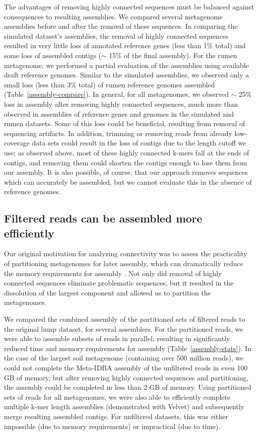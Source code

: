 \documentclass[10pt]{article}
\begin{document}
The advantages of removing highly connected sequences must be balanced
against consequences to resulting assemblies.  We compared several
metagenome assemblies before and after the removal of these sequences.
In comparing the simulated dataset's assemblies, the removal of highly
connected sequences resulted in very little loss of annotated
reference genes (less than 1\% total) and some loss of assembled contigs
($\sim$ 15\% of the final assembly).  For the rumen metagenome, we
performed a partial evaluation of the assemblies using available draft
reference genomes.  Similar to the simulated assemblies, we observed
only a small loss (less than 3\% total) of rumen reference genomes assembled
(Table~\ref{assembly-compare}). In general, for all metagenomes, we observed $\sim$ 25\%
loss in assembly after removing highly connected sequences, much more
than observed in assemblies of reference genes and genomes in the
simulated and rumen datasets.  Some of this loss could be beneficial,
resulting from removal of sequencing artifacts.  In addition, trimming
or removing reads from already low-coverage data sets could result in
the loss of contigs due to the length cutoff we use; as observed
above, most of these highly connected k-mers fall at the ends of
contigs, and removing them could shorten the contigs enough to lose
them from our assembly.  It is also possible, of course, that our
approach removes sequences which can accurately be assembled, but we
cannot evaluate this in the absence of reference genomes.

\subsection*{Filtered reads can be assembled more efficiently}

Our original motivation for analyzing connectivity was to assess the
practicality of partitioning metagenomes for later assembly, which can
dramatically reduce the memory requirements for assembly
\cite{Pell:2012cq}.  Not only did removal of highly connected sequences
eliminate problematic sequences, but it resulted in the dissolution
of the largest component and allowed us to partition the metagenomes.

We compared the combined assembly of the partitioned sets of filtered
reads to the original lump dataset, for several assemblers.  For the
partitioned reads, we were able to assemble subsets of reads in
parallel, resulting in significantly reduced time and memory
requirements for assembly (Table~\ref{assembly-stats}).  In the case of the largest soil
metagenome (containing over 500 million reads), we could not complete
the Meta-IDBA assembly of the unfiltered reads in even 100 GB of
memory, but after removing highly connected sequences and
partitioning, the assembly could be completed in less than 2 GB of
memory.  Using partitioned sets of reads for all metagenomes, we were
also able to efficiently complete multiple k-mer length assemblies
(demonstrated with Velvet) and subsequently merge resulting assembled
contigs.  For unfiltered datasets, this was either impossible (due to
memory requirements) or impractical (due to time).
\end{document}
